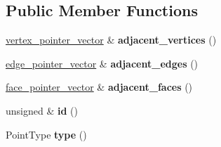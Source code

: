 \subsection*{Public Member Functions}
\begin{DoxyCompactItemize}
\item 
\hypertarget{classgeodesic_1_1_mesh_element_base_a480d07d33b01aed5525f428781aaa740}{}\hyperlink{classgeodesic_1_1_simple_vector}{vertex\+\_\+pointer\+\_\+vector} \& {\bfseries adjacent\+\_\+vertices} ()\label{classgeodesic_1_1_mesh_element_base_a480d07d33b01aed5525f428781aaa740}

\item 
\hypertarget{classgeodesic_1_1_mesh_element_base_a4f747e529f732bddf9439d10946c96d9}{}\hyperlink{classgeodesic_1_1_simple_vector}{edge\+\_\+pointer\+\_\+vector} \& {\bfseries adjacent\+\_\+edges} ()\label{classgeodesic_1_1_mesh_element_base_a4f747e529f732bddf9439d10946c96d9}

\item 
\hypertarget{classgeodesic_1_1_mesh_element_base_afe21848dd1b8009627c4818cd3f7a6b1}{}\hyperlink{classgeodesic_1_1_simple_vector}{face\+\_\+pointer\+\_\+vector} \& {\bfseries adjacent\+\_\+faces} ()\label{classgeodesic_1_1_mesh_element_base_afe21848dd1b8009627c4818cd3f7a6b1}

\item 
\hypertarget{classgeodesic_1_1_mesh_element_base_ad33adcf749c668a25fbd9d1f937222da}{}unsigned \& {\bfseries id} ()\label{classgeodesic_1_1_mesh_element_base_ad33adcf749c668a25fbd9d1f937222da}

\item 
\hypertarget{classgeodesic_1_1_mesh_element_base_a667dabb1394e5611a5486da711b1962b}{}Point\+Type {\bfseries type} ()\label{classgeodesic_1_1_mesh_element_base_a667dabb1394e5611a5486da711b1962b}

\end{DoxyCompactItemize}
